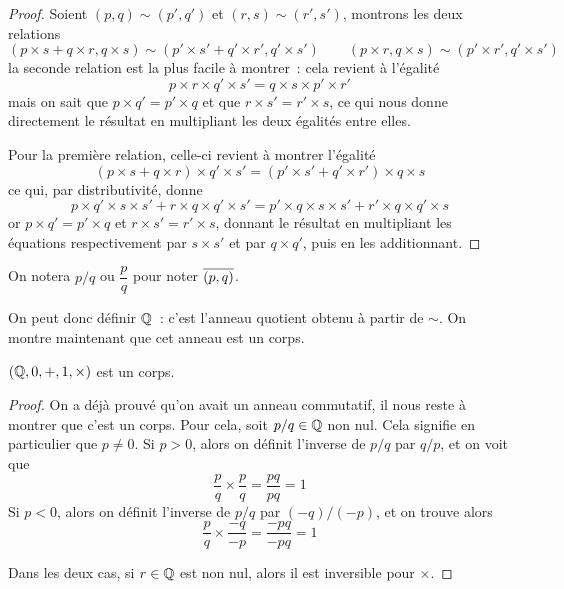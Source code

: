 \begin{proof}
  Soient $(p,q)\sim(p',q')$ et $(r,s)\sim(r',s')$, montrons les deux relations
  \[(p\times s + q\times r, q \times s) \sim
  (p'\times s' + q'\times r',q'\times s')\qquad
  (p\times r, q\times s)\sim(p'\times r', q'\times s')\]
  la seconde relation est la plus facile à montrer~: cela revient à l'égalité
  \[p\times r \times q' \times s' = q\times s \times p' \times r'\]
  mais on sait que $p\times q' = p' \times q$ et que
  $r \times s' = r' \times s$, ce qui nous donne directement le résultat en
  multipliant les deux égalités entre elles.

  Pour la première relation, celle-ci revient à montrer l'égalité
  \[(p\times s + q \times r)\times q' \times s' =
  (p'\times s' + q' \times r')\times q \times s\]
  ce qui, par distributivité, donne
  \[p\times q' \times s \times s' + r \times q \times q' \times s' =
  p'\times q \times s \times s' + r' \times q \times q' \times s\]
  or $p\times q' = p' \times q$ et $r\times s' = r' \times s$, donnant le
  résultat en multipliant les équations respectivement par $s\times s'$ et par
  $q\times q'$, puis en les additionnant.
\end{proof}

\begin{notation}
  On notera $p/q$ ou $\dfrac{p}{q}$ pour noter $\overline{(p,q)}$.
\end{notation}

On peut donc définir $\bQ$~: c'est l'anneau quotient obtenu à partir de $\sim$.
On montre maintenant que cet anneau est un corps.
\index[notation]{$\bQ$}

\begin{proposition}
  $(\mathbb Q,0,+,1,\times)$ est un corps.
\end{proposition}

\begin{proof}
  On a déjà prouvé qu'on avait un anneau commutatif, il nous reste à montrer que
  c'est un corps. Pour cela, soit $p/q\in\mathbb Q$ non nul. Cela signifie en
  particulier que $p \neq 0$. Si $p > 0$, alors on définit l'inverse
  de $p/q$ par $q/p$, et on voit que
  \[\frac{p}{q}\times\frac{p}{q} = \frac{pq}{pq} = 1\]
  Si $p < 0$, alors on définit l'inverse de $p/q$ par $(-q)/(-p)$, et on
  trouve alors
  \[\frac{p}{q}\times\frac{-q}{-p} = \frac{-pq}{-pq} = 1\]

  Dans les deux cas, si $r\in \mathbb Q$ est non nul, alors il est inversible
  pour $\times$.
\end{proof}


